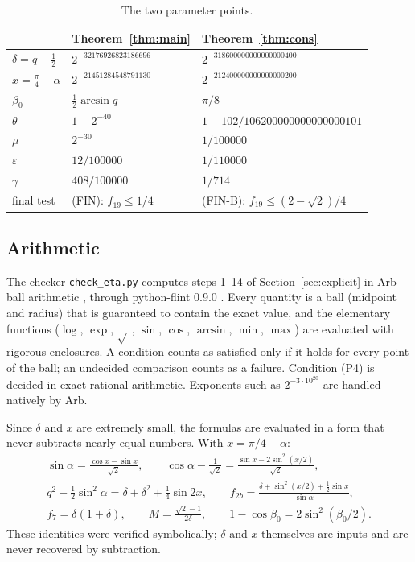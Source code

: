 \documentclass[11pt]{amsart}
\theoremstyle{remark}
\theoremstyle{plain}
\newcommand{\eps}{\varepsilon}
\begin{document}
\begin{table}[ht]
\centering
\caption{The two parameter points.}\label{tab:params}
\begin{tabular}{lll}
\toprule
& Theorem~\ref{thm:main} & Theorem~\ref{thm:cons}\\
\midrule
$\delta=q-\frac12$ & $2^{-32176926823186696}$ & $2^{-318600000000000000400}$\\
$x=\frac\pi4-\alpha$ & $2^{-21451284548791130}$ & $2^{-212400000000000000200}$\\
$\beta_0$ & $\frac12\arcsin q$ & $\pi/8$\\
$\theta$ & $1-2^{-40}$ & $1-102/106200000000000000101$\\
$\mu$ & $2^{-30}$ & $1/100000$\\
$\eps$ & $12/100000$ & $1/110000$\\
$\gamma$ & $408/100000$ & $1/714$\\
final test & (FIN): $f_{19}\le1/4$ & (FIN-B): $f_{19}\le(2-\sqrt2)/4$\\
\bottomrule
\end{tabular}
\end{table}

\subsection*{Arithmetic}
The checker \texttt{check\_eta.py} computes steps 1--14 of Section~\ref{sec:explicit} in Arb ball arithmetic \cite{Joh17}, through python-flint 0.9.0 \cite{FLINT}. Every quantity is a ball (midpoint and radius) that is guaranteed to contain the exact value, and the elementary functions ($\log$, $\exp$, $\sqrt{\ }$, $\sin$, $\cos$, $\arcsin$, $\min$, $\max$) are evaluated with rigorous enclosures. A condition counts as satisfied only if it holds for every point of the ball; an undecided comparison counts as a failure. Condition (P4) is decided in exact rational arithmetic. Exponents such as $2^{-3\cdot10^{20}}$ are handled natively by Arb.

Since $\delta$ and $x$ are extremely small, the formulas are evaluated in a form that never subtracts nearly equal numbers. With $x=\pi/4-\alpha$:
\begin{gather*}
\sin\alpha=\frac{\cos x-\sin x}{\sqrt2},\qquad
\cos\alpha-\frac1{\sqrt2}=\frac{\sin x-2\sin^2(x/2)}{\sqrt2},\\
q^2-\tfrac12\sin^2\alpha=\delta+\delta^2+\tfrac14\sin2x,\qquad
f_{2b}=\frac{\delta+\sin^2(x/2)+\frac12\sin x}{\sin\alpha},\\
f_7=\delta(1+\delta),\qquad M=\frac{\sqrt2-1}{2\delta},\qquad
1-\cos\beta_0=2\sin^2(\beta_0/2).
\end{gather*}
These identities were verified symbolically; $\delta$ and $x$ themselves are inputs and are never recovered by subtraction.
\end{document}
